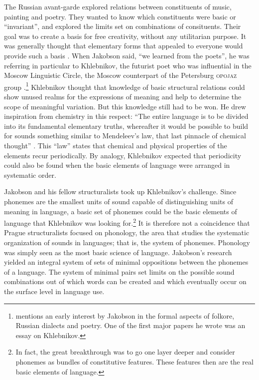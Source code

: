 \documentclass[output=paper]{langscibook}
\begin{document}
The Russian avant-garde explored relations between constituents of music, painting and poetry. They wanted to know which constituents were basic or ``invariant'', and explored the limits set on combinations of consituents. Their goal was to create a basis for free creativity, without any utilitarian purpose. It was generally thought that elementary forms that appealed to everyone would provide such a basis \citep[238--239]{Toman1995}. When Jakobson said, ``we learned from the poets'', he was referring in particular to Khlebnikov, the futurist poet who was influential in the Moscow Linguistic Circle, the Moscow counterpart of the Petersburg \textsc{opojaz} group \citep[see][]{Jakobson1979}.\footnote{ \citet[10--11]{Toman1995} mentions an early interest by Jakobson in the formal aspects of folkore, Russian dialects and poetry. One of the first major papers he wrote was an essay on Khlebnikov.} Khlebnikov thought that knowledge of basic structural relations could show unused realms for the expressions of meaning and help to determine the scope of meaningful variation. But this knowledge still had to be won. He drew inspiration from chemistry in this respect: ``The entire language is to be divided into its fundamental elementary truths, whereafter it would be possible to build for sounds something similar to Mendeleev's law, that last pinnacle of chemical thought'' \citep[Khlebnikov as translated in][95]{Gasparov2014}. This ``law'' states that chemical and physical properties of the elements recur periodically. By analogy, Khlebnikov expected that periodicity could also be found when the basic elements of language were arranged in systematic order. 

Jakobson and his fellow structuralists took up Khlebnikov's challenge. Since phonemes are the smallest units of sound capable of distinguishing units of meaning in language, a basic set of phonemes could be the basic elements of language that Khlebnikov was looking for.\footnote{In fact, the great breakthrough was to go one layer deeper and consider phonemes as bundles of constitutive features. These features then are the real basic elements of language.} It is therefore not a coincidence that Prague structuralists focused on phonology, the area that studies the systematic organization of sounds in languages; that is, the system of phonemes. Phonology was simply seen as the most basic science of language. Jakobson's research yielded an integral system of sets of minimal oppositions between the phonemes of a language. The system of minimal pairs set limits on the possible sound combinations out of which words can be created and which eventually occur on the surface level in language use. 
\end{document}
